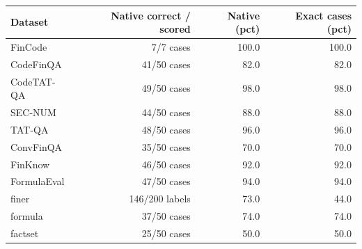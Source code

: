 \begin{tabular}{lrrr}
\toprule
Dataset & Native correct / scored & Native (pct) & Exact cases (pct) \\
\midrule
FinCode & 7/7 cases & 100.0 & 100.0 \\
CodeFinQA & 41/50 cases & 82.0 & 82.0 \\
CodeTAT-QA & 49/50 cases & 98.0 & 98.0 \\
SEC-NUM & 44/50 cases & 88.0 & 88.0 \\
TAT-QA & 48/50 cases & 96.0 & 96.0 \\
ConvFinQA & 35/50 cases & 70.0 & 70.0 \\
FinKnow & 46/50 cases & 92.0 & 92.0 \\
FormulaEval & 47/50 cases & 94.0 & 94.0 \\
finer & 146/200 labels & 73.0 & 44.0 \\
formula & 37/50 cases & 74.0 & 74.0 \\
factset & 25/50 cases & 50.0 & 50.0 \\
\bottomrule
\end{tabular}
